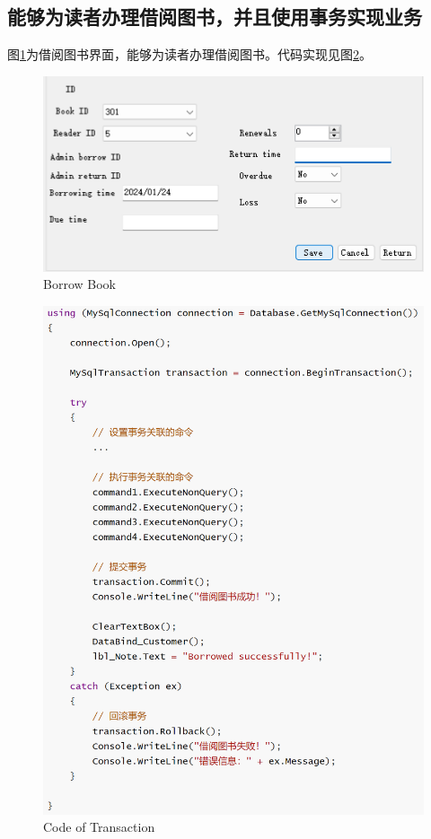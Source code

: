 \documentclass{article}
\begin{document}
\subsection{能够为读者办理借阅图书，并且使用事务实现业务}

图\ref{fig:borrow}为借阅图书界面，能够为读者办理借阅图书。代码实现见图\ref{fig:transaction}。

\begin{figure}[H]
    \centering
    \includegraphics[width=1\textwidth]{../pic/borrow.png}
    \caption{Borrow Book}
    \label{fig:borrow}
\end{figure}

\begin{figure}[H]
    \centering
    \includegraphics[width=1\textwidth]{../pic/transaction.png}
    \caption{Code of Transaction}
    \label{fig:transaction}
\end{figure}
\end{document}
